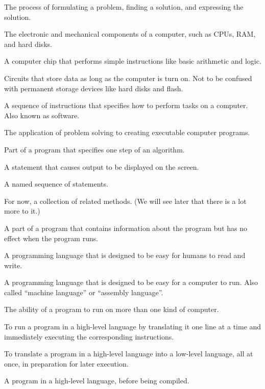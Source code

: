 \begin{description}

The process of formulating a problem, finding a solution, and expressing the solution.

The electronic and mechanical components of a computer, such as CPUs, RAM, and hard disks.

A computer chip that performs simple instructions like basic arithmetic and logic.

Circuits that store data as long as the computer is turn on.
Not to be confused with permanent storage devices like hard disks and flash.

A sequence of instructions that specifies how to perform tasks on a computer.
Also known as software.

The application of problem solving to creating executable computer programs.

Part of a program that specifies one step of an algorithm.

A statement that causes output to be displayed on the screen.

A named sequence of statements.

For now, a collection of related methods.
(We will see later that there is a lot more to it.)

A part of a program that contains information about the program but has no effect when the program runs.

A programming language that is designed to be easy for humans to read and write.

A programming language that is designed to be easy for a computer to run.
Also called ``machine language'' or ``assembly language''.

The ability of a program to run on more than one kind of computer.

To run a program in a high-level language by translating it one line at a time and immediately executing the corresponding instructions.

To translate a program in a high-level language into a low-level language, all at once, in preparation for later execution.

A program in a high-level language, before being compiled.


\end{description}
